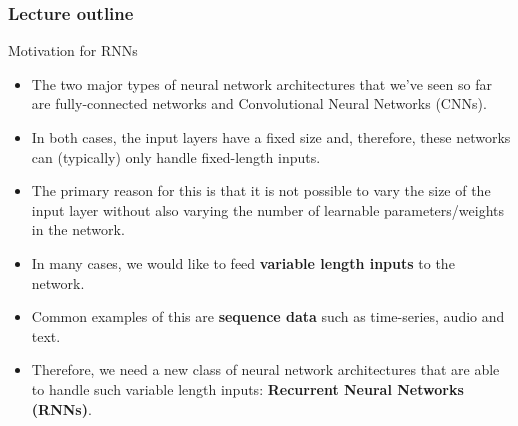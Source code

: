 
 








\begin{frame}
\frametitle{Lecture outline}
\tableofcontents
\end{frame}



\begin{frame} {Motivation for RNNs}
  \begin{itemize}
    \item The two major types of neural network architectures that we've seen so far are fully-connected networks and Convolutional Neural Networks (CNNs).
    \item In both cases, the input layers have a fixed size and, therefore, these networks can (typically) only handle fixed-length inputs.
    \item The primary reason for this is that it is not possible to vary the size of the input layer without also varying the number of learnable parameters/weights in the network.
    \item In many cases, we would like to feed \textbf{variable length inputs} to the network.
    \item Common examples of this are \textbf{sequence data} such as time-series, audio and text.
    \item Therefore, we need a new class of neural network architectures that are able to handle such variable length inputs: \textbf{Recurrent Neural Networks (RNNs)}.
  \end{itemize}
\end{frame}



 

